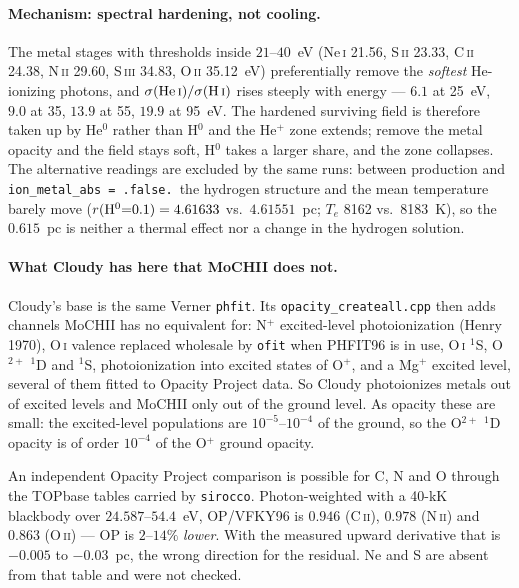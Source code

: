 \documentclass[english,a4paper]{my_memo}
\newcommand{\code}[1]{\texttt{#1}}
\begin{document}
\paragraph{Mechanism: spectral hardening, not cooling.}  The metal stages
with thresholds inside $21$--$40$~eV (Ne\,\textsc{i} 21.56,
S\,\textsc{ii} 23.33, C\,\textsc{ii} 24.38, N\,\textsc{ii} 29.60,
S\,\textsc{iii} 34.83, O\,\textsc{ii} 35.12~eV) preferentially remove the
\emph{softest} He-ionizing photons, and
$\sigma({\rm He\,\textsc{i}})/\sigma({\rm H\,\textsc{i}})$ rises steeply
with energy --- $6.1$ at 25~eV, $9.0$ at 35, $13.9$ at 55, $19.9$ at
95~eV.  The hardened surviving field is therefore taken up by He$^0$ rather
than H$^0$ and the He$^+$ zone extends; remove the metal opacity and the
field stays soft, H$^0$ takes a larger share, and the zone collapses.  The
alternative readings are excluded by the same runs: between production and
\code{ion\_metal\_abs = .false.}\ the hydrogen structure and the mean
temperature barely move ($r({\rm H^0}{=}0.1) = 4.61633$ vs.\ $4.61551$~pc;
$T_e$ 8162 vs.\ 8183~K), so the $0.615$~pc is neither a thermal effect nor a
change in the hydrogen solution.

\paragraph{What Cloudy has here that MoCHII does not.}  Cloudy's base is the
same Verner \code{phfit}.  Its
\code{opacity\_\allowbreak createall.cpp} then adds
channels MoCHII has no equivalent for: N$^+$ excited-level photoionization
(Henry 1970), O\,\textsc{i} valence replaced wholesale by \code{ofit} when
PHFIT96 is in use, O\,\textsc{i} $^1$S, O$^{2+}$ $^1$D and $^1$S,
photoionization into excited states of O$^+$, and a Mg$^+$ excited level,
several of them fitted to Opacity Project data.  So Cloudy photoionizes
metals out of excited levels and MoCHII only out of the ground level.  As
opacity these are small: the excited-level populations are
$10^{-5}$--$10^{-4}$ of the ground, so the O$^{2+}$ $^1$D opacity is of order
$10^{-4}$ of the O$^+$ ground opacity.

An independent Opacity Project comparison is possible for C, N and O
through the TOPbase tables carried by \code{sirocco}.  Photon-weighted with
a 40-kK blackbody over $24.587$--$54.4$~eV, OP/VFKY96 is $0.946$
(C\,\textsc{ii}), $0.978$ (N\,\textsc{ii}) and $0.863$ (O\,\textsc{ii}) ---
OP is $2$--$14\%$ \emph{lower}.  With the measured upward derivative that is
$-0.005$ to $-0.03$~pc, the wrong direction for the residual.  Ne and S are
absent from that table and were not checked.
\end{document}
